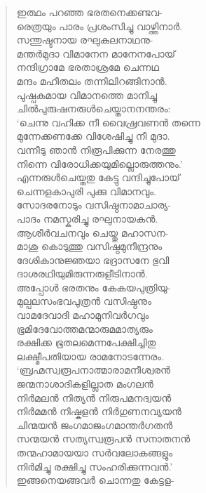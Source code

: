 \begin{verse}
ഇത്ഥം പറഞ്ഞ ഭരതനെക്കണ്ടവ-\\
രെത്രയും പാരം പ്രശംസിച്ചു വാഴ്ത്തിനാര്‍.\\
സന്തുഷ്ടനായ രഘുകുലനാഥനു-\\
മന്തര്‍മുദാ വിമാനേന മാനേനപോയ്\\
നന്ദിഗ്രാമേ ഭരതാശ്രമേ ചെന്നഥ\\
മന്ദം മഹീതലം തന്നിലിറങ്ങിനാന്‍.\\
പുഷ്പകമായ വിമാനത്തെ മാനിച്ചു\\
ചില്‍പുരുഷനരുള്‍ചെയ്താനനന്തരം:\\
‘ചെന്നു വഹിക്ക നീ വൈഷ്രവണന്‍ തന്നെ\\
മുന്നേക്കണക്കേ വിശേഷിച്ചു നീ മുദാ.\\
വന്നീടു ഞാന്‍ നിരൂപിക്കുന്ന നേരത്തു\\
നിന്നെ വിരോധിക്കയുമില്ലൊരുത്തനും.’\\
എന്നരുള്‍ചെയ്തതു കേട്ടു വന്ദിച്ചുപോയ്\\
ചെന്നളകാപുരി പുക്കു വിമാനവും.\\
സോദരനോടും വസിഷ്ഠനാമാചാര്യ-\\
പാദം നമസ്കരിച്ചു രഘുനായകന്‍.\\
ആശീര്‍വചനവും ചെയ്തു മഹാസന-\\
മാശു കൊടുത്തു വസിഷ്ഠമുനീന്ദ്രനും\\
ദേശികാനുജ്ഞയാ ഭദ്രാസനേ ഭുവി\\
ദാശരഥിയുമിരുന്നരുളീടിനാന്‍.\\
അപ്പോള്‍ ഭരതനും കേകയപുത്രിയു-\\
മുല്പലസംഭവപുത്രന്‍ വസിഷ്ഠനും\\
വാമദേവാദി മഹാമുനിവര്‍ഗവും\\
ഭൂമിദേവോത്തമന്മാരുമമാത്യരും\\
രക്ഷിക്ക ഭൂതലമെന്നപേക്ഷിച്ചിതു\\
ലക്ഷ്മീപതിയായ രാമനോടന്നേരം.\\
‘ബ്രഹ്മസ്വരൂപനാത്മാരാമനീശ്വരന്‍\\
ജന്മനാശാദികളില്ലാത മംഗലന്‍\\
നിര്‍മലന്‍ നിത്യന്‍ നിരുപമനദ്വയന്‍\\
നിര്‍മമന്‍ നിഷ്കളന്‍ നിര്‍ഗുണനവ്യയന്‍\\
ചിന്മയന്‍ ജംഗമാജംഗമാന്തര്‍ഗതന്‍\\
സന്മയന്‍ സത്യസ്വരൂപന്‍ സനാതനന്‍\\
തന്മഹാമായയാ സര്‍വലോകങ്ങളും\\
നിര്‍മിച്ചു രക്ഷിച്ചു സംഹരിക്കുന്നവന്‍.’\\
ഇങ്ങനെയങ്ങവര്‍ ചൊന്നതു കേട്ടള-\\

\end{verse}

